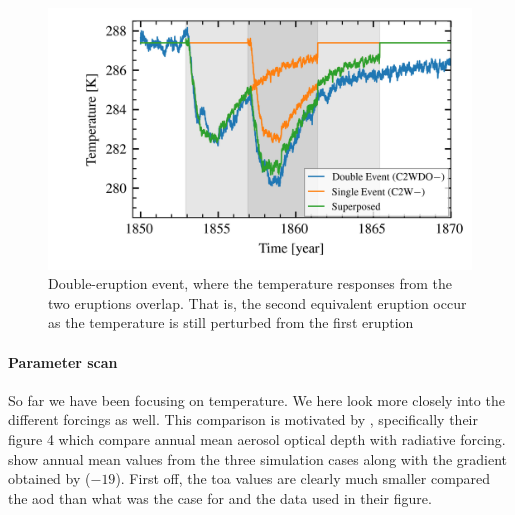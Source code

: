 \documentclass[twocol]{ametsocV5}
\begin{document}
\begin{figure}
  \begin{center}
    \includegraphics[width=0.95\linewidth]{figures/double-overlap-superpose.png}
  \end{center}
  \caption{Double-eruption event, where the temperature responses from the two eruptions
    overlap. That is, the second equivalent eruption occur as the temperature is still
    perturbed from the first eruption}%
  \label{fig:double-overlap-superpose}
\end{figure}

\paragraph{Parameter scan}

So far we have been focusing on temperature. We here look more closely into the
different forcings as well. This comparison is motivated by \citet{gregory2016},
specifically their figure 4 which compare annual mean aerosol optical depth with
radiative forcing.  show annual mean values from the three
simulation cases along with the gradient obtained by \citet{gregory2016} (\(-19\)).
First off, the \acrshort{toa} values are clearly much smaller compared the
\acrshort{aod} than what was the case for \citet{gregory2016} and the data used in their
figure.
\end{document}
